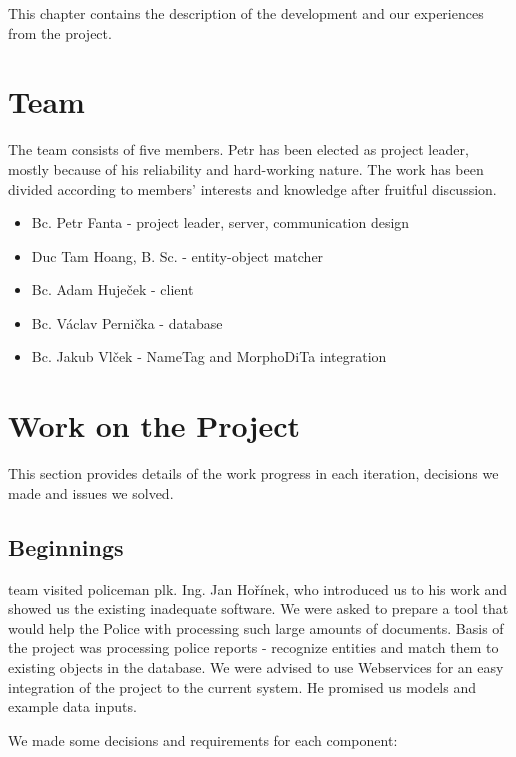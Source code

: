 This chapter contains the description of the development and our experiences from
the project.

\section{Team}

The team consists of five members. Petr has been elected as project leader,
mostly because of his reliability and hard-working nature. The work has been
divided according to members' interests and knowledge after fruitful discussion.

\begin{itemize}
\itemsep0em
\item Bc. Petr Fanta - project leader, server, communication design
\item Duc Tam Hoang, B. Sc. - entity-object matcher 
\item Bc. Adam Huječek - client
\item Bc. Václav Pernička - database
\item Bc. Jakub Vlček - NameTag and MorphoDiTa integration
\end{itemize}

\section{Work on the Project}

This section provides details of the work progress in each iteration, decisions
we made and issues we solved.

\subsection{Beginnings}
\textan{} team visited policeman plk. Ing. Jan Hořínek, who introduced us to his
work and showed us the existing inadequate software. We were asked to prepare
a tool that would help the Police with processing such large amounts of
documents. Basis of the project was processing police reports - recognize
entities and match them to existing objects in the database. We were advised to
use Webservices for an easy integration of the project to the current system. He
promised us models and example data inputs.

We made some decisions and requirements for each component:

